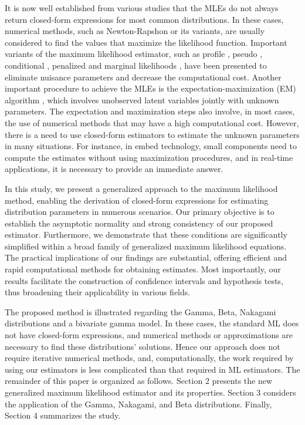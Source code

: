 \documentclass[12pt]{article} %
\theoremstyle{definition}
\begin{document}
It is now well established from various studies that the MLEs do not always return closed-form expressions for most common distributions. In these cases, numerical methods, such as Newton-Rapshon or its variants, are usually considered to find the values that maximize the likelihood function. Important variants of the maximum likelihood estimator, such as profile \citep{murphy2000profile}, pseudo \citep{gourieroux1984pseudo}, conditional \citep{andersen1970asymptotic}, penalized \citep{anderson1982penalized, firth1993bias} and marginal likelihoods \citep{cox1975partial}, have been presented to eliminate nuisance parameters and decrease the computational cost. Another important procedure to achieve the MLEs is the expectation-maximization (EM) algorithm \citep{dempster1977maximum}, which involves unobserved latent variables jointly with unknown parameters. The expectation and maximization steps also involve, in most cases, the use of numerical methods that may have a high computational cost. However, there is a need to use closed-form estimators to estimate the unknown parameters in many situations. For instance, in embed technology, small components need to compute the estimates without using maximization procedures, and in real-time applications, it is necessary to provide an immediate answer.

In this study, we present a generalized approach to the maximum likelihood method, enabling the derivation of closed-form expressions for estimating distribution parameters in numerous scenarios. Our primary objective is to establish the asymptotic normality and strong consistency of our proposed estimator. Furthermore, we demonstrate that these conditions are significantly simplified within a broad family of generalized maximum likelihood equations. The practical implications of our findings are substantial, offering efficient and rapid computational methods for obtaining estimates. Most importantly, our results facilitate the construction of confidence intervals and hypothesis tests, thus broadening their applicability in various fields.


The proposed method is illustrated regarding the Gamma, Beta, Nakagami distributions and a bivariate gamma model. In these cases, the standard ML does not have closed-form expressions, and numerical methods or approximations are necessary to find these distributions' solutions. Hence our approach does not require iterative numerical methods, and, computationally, the work required by using our estimators is less complicated than that required in ML estimators. The remainder of this paper is organized as follows. Section 2 presents the new generalized maximum likelihood estimator and its properties. Section 3 considers the application of the Gamma, Nakagami, and Beta distributions. Finally, Section 4 summarizes the study.
\end{document}
